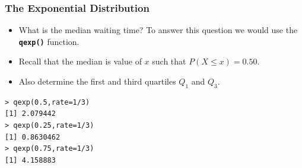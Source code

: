 \documentclass[MAIN.tex]{subfiles}
\begin{document}
\begin{frame}[fragile]
	\frametitle{The Exponential Distribution}
	\large
\begin{itemize}
\item What is the median waiting time? To answer this question we would use the \texttt{\textbf{qexp()}} function.
\item Recall that the median is value of $x$ such that $P(X \leq x) = 0.50$.
\item Also determine the first and third quartiles $Q_1$ and $Q_3$.
\end{itemize}
\begin{framed}
\begin{verbatim}
> qexp(0.5,rate=1/3)
[1] 2.079442
> qexp(0.25,rate=1/3)
[1] 0.8630462
> qexp(0.75,rate=1/3)
[1] 4.158883
\end{verbatim}
\end{framed}
\end{frame}
\end{document}
